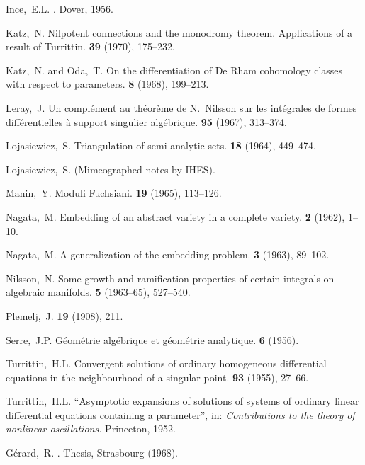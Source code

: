 \documentclass{report}
\begin{document}
\begin{thebibliography}{26}
  {Ince,~E.L.}
  .
  \newblock Dover, 1956.

  {Katz,~N.}
  \newblock Nilpotent connections and the monodromy theorem. Applications of a result of Turrittin.
   \textbf{39} (1970), 175--232.

  {Katz,~N. and Oda,~T.}
  \newblock On the differentiation of De Rham cohomology classes with respect to parameters.
   \textbf{8} (1968), 199--213.

  {Leray,~J.}
  \newblock Un compl\'{e}ment au th\'{e}or\`{e}me de N.~Nilsson sur les int\'{e}grales de formes diff\'{e}rentielles \`{a} support singulier alg\'{e}brique.
   \textbf{95} (1967), 313--374.

  {Lojasiewicz,~S.}
  \newblock Triangulation of semi-analytic sets.
   \textbf{18} (1964), 449--474.

  {Lojasiewicz,~S.}
  \newblock (Mimeographed notes by IHES).

  {Manin,~Y.}
  \newblock Moduli Fuchsiani.
   \textbf{19} (1965), 113--126.

  {Nagata,~M.}
  \newblock Embedding of an abstract variety in a complete variety.
   \textbf{2} (1962), 1--10.

  {Nagata,~M.}
  \newblock A generalization of the embedding problem.
   \textbf{3} (1963), 89--102.

  {Nilsson,~N.}
  \newblock Some growth and ramification properties of certain integrals on algebraic manifolds.
   \textbf{5} (1963--65), 527--540.

  {Plemelj,~J.}
   \textbf{19} (1908), 211.

  {Serre,~J.P.}
  \newblock Géométrie algébrique et géométrie analytique.
   \textbf{6} (1956).

  {Turrittin,~H.L.}
  \newblock Convergent solutions of ordinary homogeneous differential equations in the neighbourhood of a singular point.
   \textbf{93} (1955), 27--66.

  {Turrittin,~H.L.}
  \newblock ``Asymptotic expansions of solutions of systems of ordinary linear differential equations containing a parameter'', in: {\em Contributions to the theory of nonlinear oscillations.}
  \newblock Princeton, 1952.

  {G\'{e}rard,~R.}
  .
  \newblock Thesis, Strasbourg (1968).

\end{thebibliography}
\end{document}

